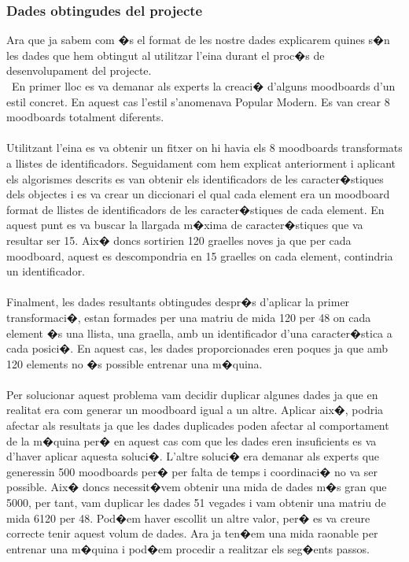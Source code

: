 \documentclass[12pt,a4paper,openright,oneside]{article}
\numberwithin{equation}{section}
\theoremstyle{definition}
\begin{document}
\subsubsection{Dades obtingudes del projecte}
Ara que ja sabem com �s el format de les nostre dades explicarem quines s�n les dades que hem obtingut al utilitzar l'eina durant el proc�s de desenvolupament del projecte.\\\
En primer lloc es va demanar als experts la creaci� d'alguns moodboards d'un estil concret. En aquest cas l'estil s'anomenava Popular Modern. Es van crear 8 moodboards totalment diferents.\\\\
Utilitzant l'eina es va obtenir un fitxer on hi havia els 8 moodboards transformats a llistes de identificadors. Seguidament com hem explicat anteriorment i aplicant els algorismes descrits es van obtenir els identificadors de les caracter�stiques dels objectes i es va crear un diccionari el qual cada element era un moodboard format de llistes de identificadors de les caracter�stiques de cada element. En aquest punt es va buscar la llargada m�xima de caracter�stiques que va resultar ser 15. Aix� doncs sortirien 120 graelles noves ja que per cada moodboard, aquest es descompondria en 15 graelles on cada element, contindria un identificador. \\\\
Finalment, les dades resultants obtingudes despr�s d'aplicar la primer transformaci�, estan formades per una matriu de mida 120 per 48 on cada element �s una llista, una graella, amb un identificador d'una caracter�stica a cada posici�. En aquest cas, les dades proporcionades eren poques ja que amb 120 elements no �s possible entrenar una m�quina.\\\\
Per solucionar aquest problema vam decidir duplicar algunes dades ja que en realitat era com generar un moodboard igual a un altre. Aplicar aix�, podria afectar als resultats ja que les dades duplicades poden afectar al comportament de la m�quina per� en aquest cas com que les dades eren insuficients es va d'haver aplicar aquesta soluci�. L'altre soluci� era demanar als experts que generessin 500 moodboards per� per falta de temps i coordinaci� no va ser possible. Aix� doncs necessit�vem obtenir una mida de dades m�s gran que 5000, per tant, vam duplicar les dades 51 vegades i vam obtenir una matriu de mida 6120 per 48. Pod�em haver escollit un altre valor, per� es va creure correcte tenir aquest volum de dades. Ara ja ten�em una mida raonable per entrenar una m�quina i pod�em procedir a realitzar els seg�ents passos.
\end{document}
